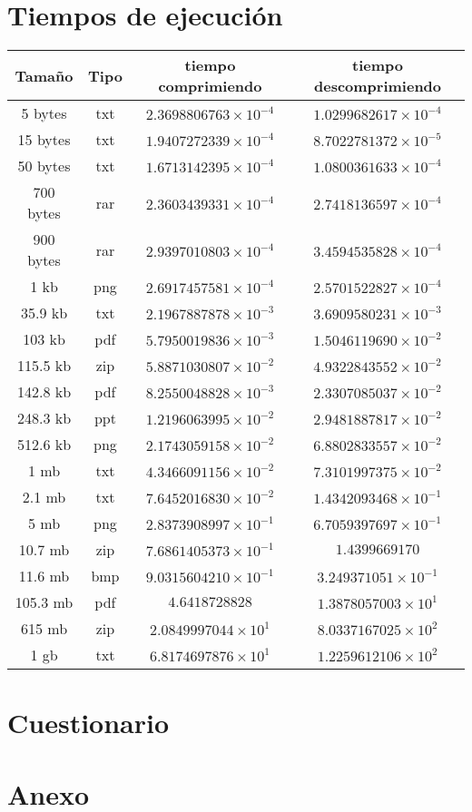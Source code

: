 \documentclass[12 pt]{report}
\begin{document}
\section*{Tiempos de ejecución}
\begin{tabular}{ || c c | c | c || }
  \hline
  Tamaño & Tipo & tiempo comprimiendo & tiempo descomprimiendo  \\[0.5ex]
  \hline \hline
  5 bytes & txt & $2.3698806763\times10^{-4}$ & $1.0299682617\times10^{-4}$\\
  15 bytes & txt & $1.9407272339\times10^{-4}$ & $8.7022781372\times10^{-5}$\\
  50 bytes & txt & $1.6713142395\times10^{-4}$ & $1.0800361633\times10^{-4}$\\
  700 bytes & rar & $2.3603439331\times10^{-4}$ & $2.7418136597\times10^{-4}$\\
  900 bytes & rar & $2.9397010803\times10^{-4}$ & $3.4594535828\times10^{-4}$\\
  1 kb & png & $2.6917457581\times10^{-4}$ & $2.5701522827\times10^{-4}$\\
  35.9 kb & txt & $2.1967887878\times10^{-3}$ & $3.6909580231\times10^{-3}$\\
  103 kb & pdf & $5.7950019836\times10^{-3}$ & $1.5046119690\times10^{-2}$\\
  115.5 kb & zip & $ 5.8871030807\times10^{-2}$ & $4.9322843552\times10^{-2}$\\
  142.8 kb & pdf & $8.2550048828\times10^{-3}$ & $2.3307085037\times10^{-2}$\\
  248.3 kb & ppt & $1.2196063995\times10^{-2}$ & $2.9481887817\times10^{-2}$\\
  512.6 kb & png & $2.1743059158\times10^{-2}$ & $6.8802833557\times10^{-2}$\\
  1 mb & txt &  $4.3466091156\times10^{-2}$ & $7.3101997375\times10^{-2}$\\
  2.1 mb & txt & $7.6452016830\times10^{-2}$ & $1.4342093468\times10^{-1}$\\
  5 mb & png & $2.8373908997\times10^{-1}$ & $6.7059397697\times10^{-1}$\\
  10.7 mb & zip & $7.6861405373\times10^{-1}$ & $1.4399669170$\\
  11.6 mb & bmp & $9.0315604210\times10^{-1}$ & $3.249371051\times10^{-1}$\\
  105.3 mb & pdf & $4.6418728828$ & $1.3878057003\times10^{1}$\\
  615 mb & zip &  $2.0849997044\times10^{1}$ & $8.0337167025\times10^{2}$ \\
  1 gb & txt & $6.8174697876\times10^{1}$ & $1.2259612106\times10^{2}$ \\
  [1ex]
  \hline
\end{tabular}



\section*{Cuestionario}

\section*{Anexo}
\end{document}
